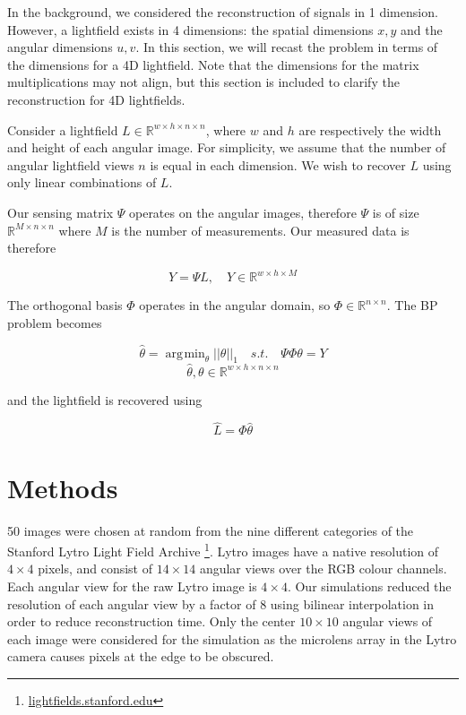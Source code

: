 \documentclass[10pt,twocolumn,letterpaper]{article}
\DeclareMathOperator*{\argmin}{\arg\!\min}
\begin{document}
In the background, we considered the reconstruction of signals in 1 dimension. However, a lightfield exists in 4 dimensions: the spatial dimensions $x, y$ and the angular dimensions $u, v$. In this section, we will recast the problem in terms of the dimensions for a 4D lightfield. Note that the dimensions for the matrix multiplications may not align, but this section is included to clarify the reconstruction for 4D lightfields.

Consider a lightfield $L \in \mathbb{R}^{w \times h \times n \times n}$, where $w$ and $h$ are respectively the width and height of each angular image. For simplicity, we assume that the number of angular lightfield views $n$ is equal in each dimension. We wish to recover $L$ using only linear combinations of $L$.

Our sensing matrix $\Psi$ operates on the angular images, therefore $\Psi$ is of size $\mathbb{R}^{M \times n \times n}$ where $M$ is the number of measurements. Our measured data is therefore

\[Y = \Psi L, \quad Y \in \mathbb{R}^{w \times h \times M}\]

The orthogonal basis $\Phi$ operates in the angular domain, so $\Phi \in \mathbb{R}^{n \times n}$. The BP problem becomes

\[ \hat{\theta} = \argmin_\theta ||\theta||_1 \quad s.t. \quad \Psi\Phi\theta = Y\]
\[ \hat{\theta}, \theta \in \mathbb{R}^{w \times h \times n \times n}\]

and the lightfield is recovered using

\[ \hat{L} = \Phi \hat{\theta}\]


\section{Methods}


50 images were chosen at random from the nine different categories of the Stanford Lytro Light Field Archive \footnote{\url{lightfields.stanford.edu}}. Lytro images have a native resolution of $4 \times 4$ pixels, and consist of $14 \times 14$ angular views over the RGB colour channels. Each angular view for the raw Lytro image is $4 \times 4$. Our simulations reduced the resolution of each angular view by a factor of $8$ using bilinear interpolation in order to reduce reconstruction time. Only the center $10 \times 10$ angular views of each image were considered for the simulation as the microlens array in the Lytro camera causes pixels at the edge to be obscured.
\end{document}
